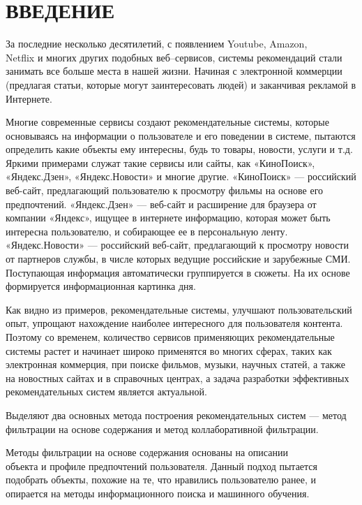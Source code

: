 \section*{ВВЕДЕНИЕ}

За последние несколько десятилетий, с появлением Youtube, Amazon,\\Netflix и многих других подобных веб–сервисов, системы рекомендаций стали занимать все больше места в нашей жизни. Начиная с электронной коммерции (предлагая статьи, которые могут заинтересовать людей) и заканчивая рекламой в Интернете.

Многие современные сервисы создают рекомендательные системы, которые основываясь на информации о пользователе и его поведении в системе, пытаются определить какие объекты ему интересны, будь то товары, новости, услуги  и т.д. Яркими примерами служат такие сервисы или сайты, как «КиноПоиск», «Яндекс.Дзен», «Яндекс.Новости» и многие другие. «КиноПоиск» --- российский веб-сайт, предлагающий пользователю к просмотру фильмы на основе его предпочтений. «Яндекс.Дзен» --- веб-сайт и расширение для браузера от компании «Яндекс», ищущее в интернете информацию, которая может быть интересна пользователю, и собирающее ее в персональную ленту. «Яндекс.Новости» --- российский веб-сайт, предлагающий к просмотру новости от партнеров службы, в числе которых ведущие российские и зарубежные СМИ. Поступающая информация автоматически группируется в сюжеты. На их основе формируется информационная картинка дня.

Как видно из примеров, рекомендательные системы, улучшают пользовательский опыт, упрощают нахождение наиболее интересного для пользователя контента. Поэтому со временем, количество сервисов применяющих рекомендательные системы растет и начинает широко применятся во многих сферах, таких как электронная коммерция, при поиске фильмов, музыки, научных статей, а также на новостных сайтах и в справочных центрах, а задача разработки эффективных рекомендательных систем является актуальной.

Выделяют два основных метода построения рекомендательных систем --- метод фильтрации на основе содержания и метод коллаборативной фильтрации.

Методы фильтрации на основе содержания основаны на описании\\объекта и профиле предпочтений пользователя. Данный подход пытается подобрать объекты, похожие на те, что нравились пользователю ранее, и опирается на методы информационного поиска и машинного обучения.

